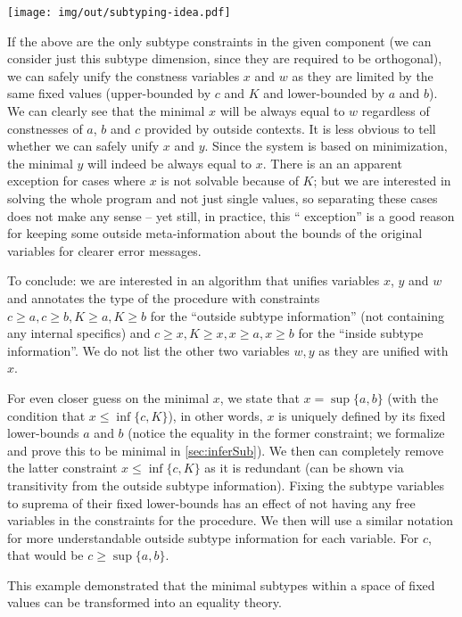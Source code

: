 \centerline{\texttt{[image: img/out/subtyping-idea.pdf]}}

If the above are the only subtype constraints in the given component (we can consider just this subtype dimension, since they are required to be orthogonal), we can safely unify the constness variables $x$ and $w$ as they are limited by the same fixed values (upper-bounded by $c$ and $K$ and lower-bounded by $a$ and $b$). We can clearly see that the minimal $x$ will be always equal to $w$ regardless of constnesses of $a$, $b$ and $c$ provided by outside contexts. It is less obvious to tell whether we can safely unify $x$ and $y$. Since the system is based on minimization, the minimal $y$ will indeed be always equal to $x$. There is an an apparent exception for cases where $x$ is not solvable because of $K$; but we are interested in solving the whole program and not just single values, so separating these cases does not make any sense -- yet still, in practice, this `` exception'' is a good reason for keeping some outside meta-information about the bounds of the original variables for clearer error messages.

To conclude: we are interested in an algorithm that unifies variables $x$, $y$ and $w$ and annotates the type of the procedure with constraints $c \geq a, c \geq b, K \geq a, K \geq b$ for the ``outside subtype information'' (not containing any internal specifics) and $c \geq x, K \geq x, x \geq a, x \geq b$ for the ``inside subtype information''. We do not list the other two variables $w, y$ as they are unified with $x$.

For even closer guess on the minimal $x$, we state that $x = \sup \{a, b\}$ (with the condition that $x \leq \inf \{c, K\}$), in other words, $x$ is uniquely defined by its fixed lower-bounds $a$ and $b$ (notice the equality in the former constraint; we formalize and prove this to be minimal in \cref{sec:inferSub}). We then can completely remove the latter constraint $x \leq \inf \{c, K\}$ as it is redundant (can be shown via transitivity from the outside subtype information). Fixing the subtype variables to suprema of their fixed lower-bounds has an effect of not having any free variables in the constraints for the procedure. We then will use a similar notation for more understandable outside subtype information for each variable. For $c$, that would be $c \geq \sup \{a, b\}$.

This example demonstrated that the minimal subtypes within a space of fixed values can be transformed into an equality theory.

